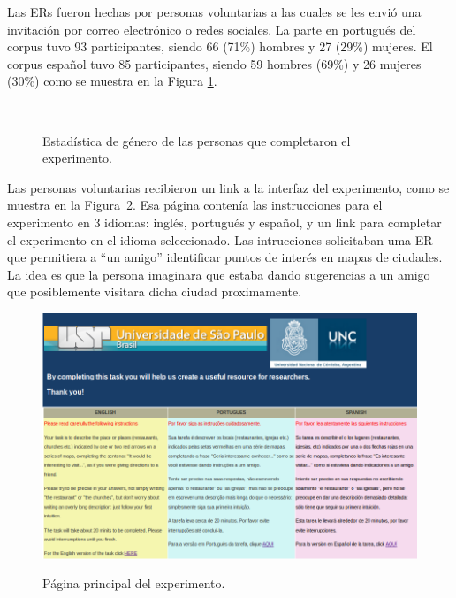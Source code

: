 Las ERs fueron hechas por personas voluntarias a las cuales se les envi\'o una invitaci\'on por correo electr\'onico o redes sociales. La parte en portugu\'es del corpus tuvo 93 participantes, siendo 66 (71\%) hombres y 27 (29\%) mujeres. El corpus espa\~nol tuvo 85 participantes, siendo 59 hombres (69\%) y 26 mujeres (30\%) como se muestra en la Figura \ref{estadistica-mf}.
\begin{figure}[ht]
\begin{center}
\\[0pt]
\caption{Estad\'istica de g\'enero de las personas que completaron el experimento.}
\label{estadistica-mf}
\end{center}
\end{figure}

Las personas voluntarias recibieron un link a la interfaz del experimento, como se muestra en la Figura~\ref{fig_pagPrincipal_seleccion_idioma}. Esa p\'agina conten\'{i}a las instrucciones para el experimento en 3 idiomas: ingl\'es, portugu\'es y espa\~{n}ol, y un link para completar el experimento en el idioma seleccionado. Las intrucciones solicitaban uma ER que permitiera a ``un amigo'' identificar puntos de inter\'es en mapas de ciudades. La idea es que la persona imaginara que estaba dando sugerencias a un amigo que posiblemente visitara dicha ciudad proximamente. 
\begin{figure}[ht]
\begin{center}
\includegraphics[width=17cm]{images/pagPrincipal.png}\\[0pt]
\caption{P\'agina principal del experimento.}
\label{fig_pagPrincipal_seleccion_idioma}
\end{center}
\end{figure}

